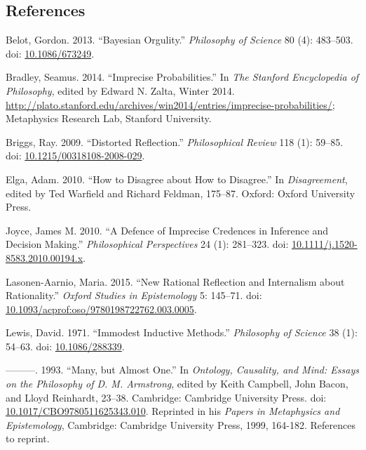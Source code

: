 \documentclass[
  10pt,
  letterpaper,
  DIV=11,
  numbers=noendperiod,
  twoside]{scrartcl}
\newlength{\cslhangindent}
\newenvironment{CSLReferences}[2] %
 {\begin{list}{}{%
  \setlength{\itemindent}{0pt}
  \setlength{\leftmargin}{0pt}
  \setlength{\parsep}{0pt}
  \ifodd #1
   \setlength{\leftmargin}{\cslhangindent}
   \setlength{\itemindent}{-1\cslhangindent}
  \fi
  \setlength{\itemsep}{#2\baselineskip}}}
 {\end{list}}
\begin{document}
\subsection*{References}\label{references}

\label{refs}
\begin{CSLReferences}{1}{0}
Belot, Gordon. 2013. {``Bayesian Orgulity.''} \emph{Philosophy of
Science} 80 (4): 483--503. doi:
\href{https://doi.org/10.1086/673249}{10.1086/673249}.

Bradley, Seamus. 2014. {``Imprecise Probabilities.''} In \emph{The
Stanford Encyclopedia of Philosophy}, edited by Edward N. Zalta, Winter
2014.
\url{http://plato.stanford.edu/archives/win2014/entries/imprecise-probabilities/};
Metaphysics Research Lab, Stanford University.

Briggs, Ray. 2009. {``Distorted Reflection.''} \emph{Philosophical
Review} 118 (1): 59--85. doi:
\href{https://doi.org/10.1215/00318108-2008-029}{10.1215/00318108-2008-029}.

Elga, Adam. 2010. {``How to Disagree about How to Disagree.''} In
\emph{Disagreement}, edited by Ted Warfield and Richard Feldman,
175--87. Oxford: Oxford University Press.

Joyce, James M. 2010. {``A Defence of Imprecise Credences in Inference
and Decision Making.''} \emph{Philosophical Perspectives} 24 (1):
281--323. doi:
\href{https://doi.org/10.1111/j.1520-8583.2010.00194.x}{10.1111/j.1520-8583.2010.00194.x}.

Lasonen-Aarnio, Maria. 2015. {``New Rational Reflection and Internalism
about Rationality.''} \emph{Oxford Studies in Epistemology} 5: 145--71.
doi:
\href{https://doi.org/10.1093/acprof:oso/9780198722762.003.0005}{10.1093/acprof:oso/9780198722762.003.0005}.

Lewis, David. 1971. {``Immodest Inductive Methods.''} \emph{Philosophy
of Science} 38 (1): 54--63. doi:
\href{https://doi.org/10.1086/288339}{10.1086/288339}.

---------. 1993. {``Many, but Almost One.''} In \emph{Ontology,
Causality, and Mind: Essays on the Philosophy of {D. M. Armstrong}},
edited by Keith Campbell, John Bacon, and Lloyd Reinhardt, 23--38.
Cambridge: Cambridge University Press. doi:
\href{https://doi.org/10.1017/CBO9780511625343.010}{10.1017/CBO9780511625343.010}.
Reprinted in his \emph{Papers in Metaphysics and Epistemology},
Cambridge: Cambridge University Press, 1999, 164-182. References to
reprint.


\end{CSLReferences}
\end{document}
